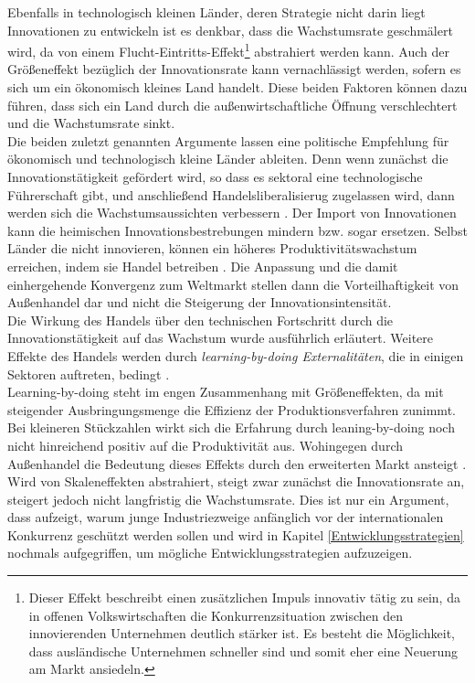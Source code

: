 %
Ebenfalls in technologisch kleinen Länder, deren Strategie nicht darin liegt Innovationen zu entwickeln ist es denkbar, dass die Wachstumsrate geschmälert wird, da von einem Flucht-Eintritts-Effekt\footnote{Dieser Effekt beschreibt einen zusätzlichen Impuls innovativ tätig zu sein, da in offenen Volkswirtschaften die Konkurrenzsituation zwischen den innovierenden Unternehmen deutlich stärker ist. Es besteht die Möglichkeit, dass ausländische Unternehmen schneller sind und somit eher eine Neuerung am Markt ansiedeln.} abstrahiert werden kann. Auch der Größeneffekt bezüglich der Innovationsrate kann vernachlässigt werden, sofern es sich um ein ökonomisch kleines Land handelt. Diese beiden Faktoren können dazu führen, dass sich ein Land  durch die außenwirtschaftliche Öffnung verschlechtert und die Wachstumsrate sinkt. \\
%
  Die beiden zuletzt genannten Argumente lassen eine politische Empfehlung für ökonomisch und technologisch kleine Länder ableiten. Denn wenn zunächst die Innovationstätigkeit gefördert wird, so dass es sektoral eine technologische Führerschaft gibt, und anschließend Handelsliberalisierug zugelassen wird, dann werden sich die Wachstumsaussichten verbessern \cite[Kapitel 15]{Aghion.2015}.
%
Der Import von Innovationen kann die heimischen Innovationsbestrebungen mindern bzw. sogar ersetzen. Selbst Länder die nicht innovieren, können ein höheres Produktivitätswachstum erreichen, indem sie Handel betreiben \cite[Kapitel 15]{Aghion.2015}. Die Anpassung und die damit einhergehende Konvergenz zum Weltmarkt stellen dann die Vorteilhaftigkeit von Außenhandel dar und nicht die Steigerung der Innovationsintensität.\\
%
Die Wirkung des Handels über den technischen Fortschritt durch die Innovationstätigkeit auf das Wachstum wurde ausführlich erläutert. Weitere Effekte des Handels werden  durch \textit{learning-by-doing Externalitäten}, die in einigen Sektoren auftreten, bedingt \cite{Young.1991,Matsuyama.}.\\
%
Learning-by-doing steht im engen Zusammenhang mit Größeneffekten, da mit steigender Ausbringungsmenge die Effizienz der Produktionsverfahren zunimmt. Bei kleineren Stückzahlen wirkt sich die Erfahrung durch leaning-by-doing noch nicht hinreichend positiv auf die Produktivität aus. Wohingegen durch Außenhandel die Bedeutung dieses Effekts durch den erweiterten Markt ansteigt \cite{Arrow.1962}.\\
Wird von Skaleneffekten abstrahiert, steigt zwar zunächst die Innovationsrate an, steigert jedoch nicht langfristig die Wachstumsrate. Dies ist nur ein Argument, dass aufzeigt, warum junge Industriezweige anfänglich vor der internationalen Konkurrenz geschützt werden sollen und wird in Kapitel \ref{Entwicklungsstrategien} nochmals aufgegriffen, um mögliche Entwicklungsstrategien aufzuzeigen.\\
